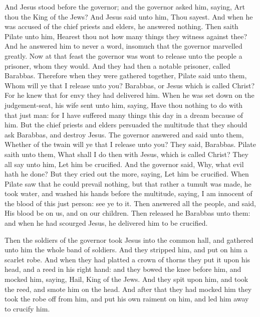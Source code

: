 And Jesus stood before the governor; and the governor asked him, saying, Art thou the King of the Jews? And Jesus said unto him, Thou sayest. And when he was accused of the chief priests and elders, he answered nothing. Then saith Pilate unto him, Hearest thou not how many things they witness against thee? And he answered him to never a word, insomuch that the governor marvelled greatly. Now at that feast the governor was wont to release unto the people a prisoner, whom they would. And they had then a notable prisoner, called Barabbas. Therefore when they were gathered together, Pilate said unto them, Whom will ye that I release unto you? Barabbas, or Jesus which is called Christ? For he knew that for envy they had delivered him. When he was set down on the judgement-seat, his wife sent unto him, saying, Have thou nothing to do with that just man: for I have suffered many things this day in a dream because of him. But the chief priests and elders persuaded the multitude that they should ask Barabbas, and destroy Jesus. The governor answered and said unto them, Whether of the twain will ye that I release unto you? They said, Barabbas. Pilate saith unto them, What shall I do then with Jesus, which is called Christ? They all say unto him, Let him be crucified. And the governor said, Why, what evil hath he done? But they cried out the more, saying, Let him be crucified. When Pilate saw that he could prevail nothing, but that rather a tumult was made, he took water, and washed his hands before the multitude, saying, I am innocent of the blood of this just person: see ye to it. Then answered all the people, and said, His blood be on us, and on our children. Then released he Barabbas unto them: and when he had scourged Jesus, he delivered him to be crucified.

Then the soldiers of the governor took Jesus into the common hall, and gathered unto him the whole band of soldiers. And they stripped him, and put on him a scarlet robe. And when they had platted a crown of thorns they put it upon his head, and a reed in his right hand: and they bowed the knee before him, and mocked him, saying, Hail, King of the Jews. And they spit upon him, and took the reed, and smote him on the head. And after that they had mocked him they took the robe off from him, and put his own raiment on him, and led him away to crucify him.

